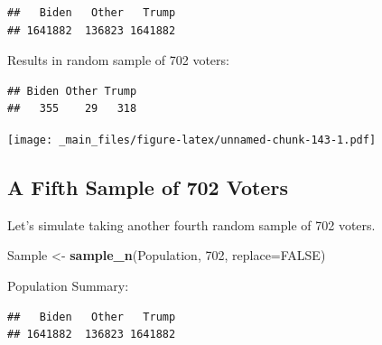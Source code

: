 \documentclass[]{book}
\newenvironment{Shaded}{\begin{snugshade}}{\end{snugshade}}
\newcommand{\KeywordTok}[1]{\textcolor[rgb]{0.13,0.29,0.53}{\textbf{#1}}}
\newcommand{\DataTypeTok}[1]{\textcolor[rgb]{0.13,0.29,0.53}{#1}}
\newcommand{\DecValTok}[1]{\textcolor[rgb]{0.00,0.00,0.81}{#1}}
\newcommand{\StringTok}[1]{\textcolor[rgb]{0.31,0.60,0.02}{#1}}
\newcommand{\OtherTok}[1]{\textcolor[rgb]{0.56,0.35,0.01}{#1}}
\newcommand{\OperatorTok}[1]{\textcolor[rgb]{0.81,0.36,0.00}{\textbf{#1}}}
\newcommand{\NormalTok}[1]{#1}
\begin{document}
\begin{Shaded}
\end{Shaded}

\begin{verbatim}
##   Biden   Other   Trump 
## 1641882  136823 1641882
\end{verbatim}

Results in random sample of 702 voters:

\begin{Shaded}
\end{Shaded}

\begin{verbatim}
## Biden Other Trump 
##   355    29   318
\end{verbatim}

\texttt{[image: \_main\_files/figure-latex/unnamed-chunk-143-1.pdf]}

\subsection{A Fifth Sample of 702
Voters}\label{a-fifth-sample-of-702-voters}

Let's simulate taking another fourth random sample of 702 voters.

\begin{Shaded}
\begin{Highlighting}[]
\NormalTok{Sample <-}\StringTok{ }\KeywordTok{sample_n}\NormalTok{(Population, }\DecValTok{702}\NormalTok{, }\DataTypeTok{replace=}\OtherTok{FALSE}\NormalTok{)}
\end{Highlighting}
\end{Shaded}

Population Summary:

\begin{Shaded}
\end{Shaded}

\begin{verbatim}
##   Biden   Other   Trump 
## 1641882  136823 1641882
\end{verbatim}
\end{document}
